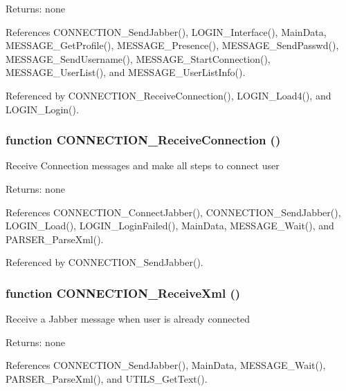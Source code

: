 \begin{Desc}
\item[Returns:]none \end{Desc}


References CONNECTION\_\-SendJabber(), LOGIN\_\-Interface(), MainData, MESSAGE\_\-GetProfile(), MESSAGE\_\-Presence(), MESSAGE\_\-SendPasswd(), MESSAGE\_\-SendUsername(), MESSAGE\_\-StartConnection(), MESSAGE\_\-UserList(), and MESSAGE\_\-UserListInfo().

Referenced by CONNECTION\_\-ReceiveConnection(), LOGIN\_\-Load4(), and LOGIN\_\-Login().
\subsubsection{\setlength{\rightskip}{0pt plus 5cm}function CONNECTION\_\-ReceiveConnection ()}\label{connection_8js_e88706b6f63308211b972745aa59ddb4}


Receive Connection messages and make all steps to connect user

\begin{Desc}
\item[Returns:]none \end{Desc}


References CONNECTION\_\-ConnectJabber(), CONNECTION\_\-SendJabber(), LOGIN\_\-Load(), LOGIN\_\-LoginFailed(), MainData, MESSAGE\_\-Wait(), and PARSER\_\-ParseXml().

Referenced by CONNECTION\_\-SendJabber().
\subsubsection{\setlength{\rightskip}{0pt plus 5cm}function CONNECTION\_\-ReceiveXml ()}\label{connection_8js_6ab2743e595a7e6e9c31b2ebc641c18a}


Receive a Jabber message when user is already connected

\begin{Desc}
\item[Returns:]none \end{Desc}


References CONNECTION\_\-SendJabber(), MainData, MESSAGE\_\-Wait(), PARSER\_\-ParseXml(), and UTILS\_\-GetText().

